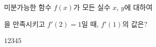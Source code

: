 미분가능한 함수 $f(x)$가 모든 실수 $x$, $y$에 대하여 \par\smallskip{}\par\smallskip\noindent 을 만족시키고 $f'(2)=1$일 때, $f'(1)$의 값은?
\begin{choices32}{$1$}{$2$}{$3$}{$4$}{$5$}\end{choices32}
